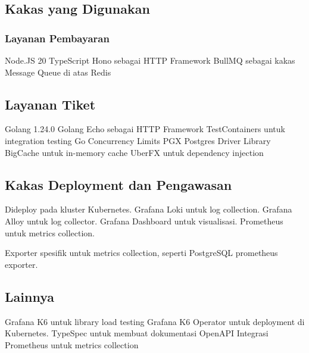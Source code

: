 \subsection{Kakas yang Digunakan}

\subsubsection{Layanan Pembayaran}

Node.JS 20
TypeScript
Hono sebagai HTTP Framework
BullMQ sebagai kakas Message Queue di atas Redis

\subsection{Layanan Tiket}

Golang 1.24.0
Golang Echo sebagai HTTP Framework
TestContainers untuk integration testing
Go Concurrency Limits
PGX Postgres Driver Library
BigCache untuk in-memory cache
UberFX untuk dependency injection

\subsection{Kakas Deployment dan Pengawasan}

Dideploy pada kluster Kubernetes.
Grafana Loki untuk log collection.
Grafana Alloy untuk log collector.
Grafana Dashboard untuk visualisasi.
Prometheus untuk metrics collection.

Exporter spesifik untuk metrics collection, seperti PostgreSQL prometheus exporter.

\subsection{Lainnya}

Grafana K6 untuk library load testing
Grafana K6 Operator untuk deployment di Kubernetes.
TypeSpec untuk membuat dokumentasi OpenAPI
Integrasi Prometheus untuk metrics collection

